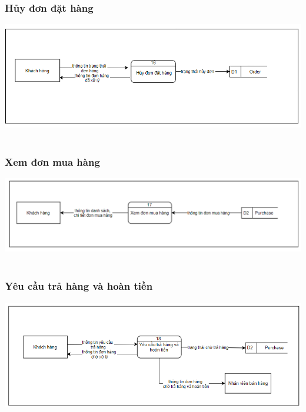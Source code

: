 \documentclass[12pt,a4paper,2sides]{report}
\begin{document}
\subsubsection{Hủy đơn đặt hàng}
    \includegraphics[width=1\linewidth]{lib/DFD/huydondathang.png}\\\vspace*{1cm}
    \hspace{5cm}{Hình 12. Hủy đơn đặt hàng}\\
\subsubsection{Xem đơn mua hàng}
    \includegraphics[width=1\linewidth]{lib/DFD/xemdonmuahang.png}\\\vspace*{1cm} 
    \hspace{5cm}{Hình 13. Xem đơn mua hàng}\\
\subsubsection{Yêu cầu trả hàng và hoàn tiền}
    \includegraphics[width=1\linewidth]{lib/DFD/yeucautrahang.png}\\\vspace*{1cm}   
    \hspace{4cm}{Hình 14. Yêu cầu trả hàng và hoàn tiền}\\
\end{document}

